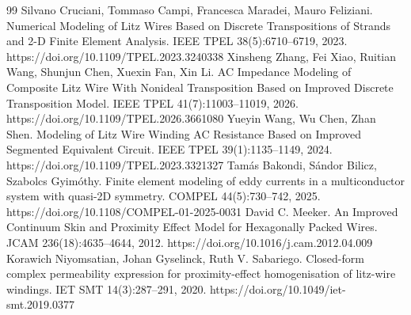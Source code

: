 \documentclass[journal,10pt]{IEEEtran}
\begin{document}
\clearpage
\begin{thebibliography}{99}
 Silvano Cruciani, Tommaso Campi, Francesca Maradei, Mauro Feliziani. Numerical Modeling of Litz Wires Based on Discrete Transpositions of Strands and 2-D Finite Element Analysis. IEEE TPEL 38(5):6710–6719, 2023. https://doi.org/10.1109/TPEL.2023.3240338
 Xinsheng Zhang, Fei Xiao, Ruitian Wang, Shunjun Chen, Xuexin Fan, Xin Li. AC Impedance Modeling of Composite Litz Wire With Nonideal Transposition Based on Improved Discrete Transposition Model. IEEE TPEL 41(7):11003–11019, 2026. https://doi.org/10.1109/TPEL.2026.3661080
 Yueyin Wang, Wu Chen, Zhan Shen. Modeling of Litz Wire Winding AC Resistance Based on Improved Segmented Equivalent Circuit. IEEE TPEL 39(1):1135–1149, 2024. https://doi.org/10.1109/TPEL.2023.3321327
 Tamás Bakondi, Sándor Bilicz, Szabolcs Gyimóthy. Finite element modeling of eddy currents in a multiconductor system with quasi-2D symmetry. COMPEL 44(5):730–742, 2025. https://doi.org/10.1108/COMPEL-01-2025-0031
 David C. Meeker. An Improved Continuum Skin and Proximity Effect Model for Hexagonally Packed Wires. JCAM 236(18):4635–4644, 2012. https://doi.org/10.1016/j.cam.2012.04.009
 Korawich Niyomsatian, Johan Gyselinck, Ruth V. Sabariego. Closed-form complex permeability expression for proximity-effect homogenisation of litz-wire windings. IET SMT 14(3):287–291, 2020. https://doi.org/10.1049/iet-smt.2019.0377
\end{thebibliography}
\end{document}
